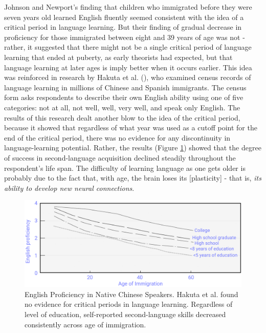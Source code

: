 \documentclass[
]{krantz}
\begin{document}
Johnson and Newport's finding that children who immigrated before they were seven years old learned English fluently seemed consistent with the idea of a critical period in language learning. But their finding of gradual decrease in proficiency for those immigrated between eight and 39 years of age was not - rather, it suggested that there might not be a single critical period of language learning that ended at puberty, as early theorists had expected, but that language learning at later ages is imply better when it occurs earlier. This idea was reinforced in research by Hakuta et al. (), who examined census records of language learning in millions of Chinese and Spanish immigrants. The census form asks respondents to describe their own English ability using one of five categories: not at all, not well, well, very well, and speak only English. The results of this research dealt another blow to the idea of the critical period, because it showed that regardless of what year was used as a cutoff point for the end of the critical period, there was no evidence for any discontinuity in language-learning potential. Rather, the results (Figure \ref{fig:languagelearning}) showed that the degree of success in second-language acquisition declined steadily throughout the respondent's life span. The difficulty of learning language as one gets older is probably due to the fact that, with age, the brain loses its {[}plasticity{]} - that is, \emph{its ability to develop new neural connections}.

\begin{figure}

{\centering \includegraphics[width=0.9\linewidth]{images/ch8/fig3} 

}

\caption{English Proficiency in Native Chinese Speakers. Hakuta et al. found no evidence for critical periods in language learning. Regardless of level of education, self-reported second-language skills decreased consistently across age of immigration.}\label{fig:languagelearning}
\end{figure}
\end{document}
